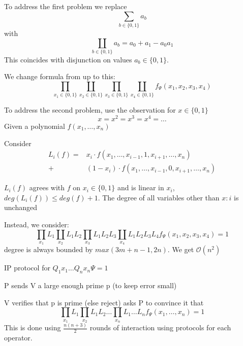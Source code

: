 \documentclass[a4paper,12pt]{article}
\theoremstyle{definition}
\theoremstyle{remark}
\begin{document}
To address the first problem we replace 
\begin{equation*}
    \sum_{b \in \{0, 1\}} a_b
\end{equation*}
with
\begin{equation*}
   \coprod_{b \in \{0, 1\}} a_b = a_0 + a_1 - a_0 a_1 %
\end{equation*}
This coincides with disjunction on values $a_b \in \{0, 1\}$.

We change formula from up to this:
\begin{equation*}
    \prod_{x_1 \in \{0, 1\}} \coprod_{x_2 \in \{0, 1\}} \prod_{x_3 \in \{0, 1\}} \coprod_{x_4 \in \{0, 1\}} f_\Psi (x_1, x_2, x_3, x_4)
\end{equation*}

To address the second problem, use the observation for $x \in \{0, 1\}$
\begin{equation*}
    x = x^2 = x^3 = x^4 = \dots
\end{equation*}
Given a polynomial $f(x_1, \dots, x_n)$

Consider
\begin{align*}
    L_i(f) =& x_i \cdot f(x_1, \dots, x_{i-1}, 1, x_{i+1}, \dots, x_n) \\
           +& (1 - x_i) \cdot f(x_1, \dots, x_{i-1}, 0, x_{i+1}, \dots, x_n)
\end{align*}

$L_i(f)$ agrees with $f$ on $x_i \in \{0, 1\}$ and is linear in $x_i$, $deg(L_i(f)) \leq deg(f) + 1$.
The degree of all variables other than $x:i$ is unchanged

Instead, we consider:
\begin{equation*}
    \prod_{x_1} L_1 \coprod_{x_2} L_1 L_2 \prod_{x_3} L_1 L_2 L_3 \coprod_{x_4} L_1 L_2 L_3 L_4 f_\Psi(x_1, x_2, x_3, x_4) = 1
\end{equation*}
degree is always bounded by $max(3m + n - 1, 2n)$. We get $\mathscr{O}(n^2)$

IP protocol for $Q_1 x_1 \dots Q_n x_n \Psi = 1$

P sends V a large enough prime p (to keep error small)

V verifies that p is prime (else reject)
asks P to convince it that
\begin{equation*}
    \prod_{x_1} L_1 \prod_{x_2} L_1 L_2 \dots \prod_{x_n} L_1 \dots L_n f_\Psi (x_1, \dots, x_n) = 1 %
\end{equation*}
This is done using $\frac{n (n + 3)}{2}$ rounds of interaction using protocols for each operator.
\end{document}
